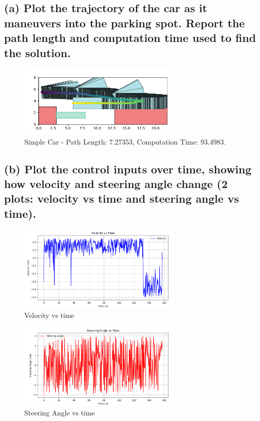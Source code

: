 \documentclass{article}
\begin{document}
\subsection*{(a) Plot the trajectory of the car as it maneuvers into the parking spot. Report the path length and computation time used to find the solution.}

\begin{figure}[H]
    \centering
    \includegraphics[width=0.7\textwidth]{2a.png} 
    \caption{Simple Car - Path Length: 7.27353, Computation Time: 93.4983.}
    \label{fig:2a}
\end{figure}

\subsection*{(b) Plot the control inputs over time, showing how velocity and steering angle change (2 plots: velocity vs time and steering angle vs time).}
    
\begin{figure}[H]
    \centering
    \includegraphics[width=0.7\textwidth]{2bVelocity.png} 
    \caption{Velocity vs time}
    \label{fig:2bVelocity}
\end{figure}

\begin{figure}[H]
    \centering
    \includegraphics[width=0.7\textwidth]{2bSteeringAngle.png} 
    \caption{Steering Angle vs time}
    \label{fig:2bSteeringAngle}
\end{figure}
\end{document}

